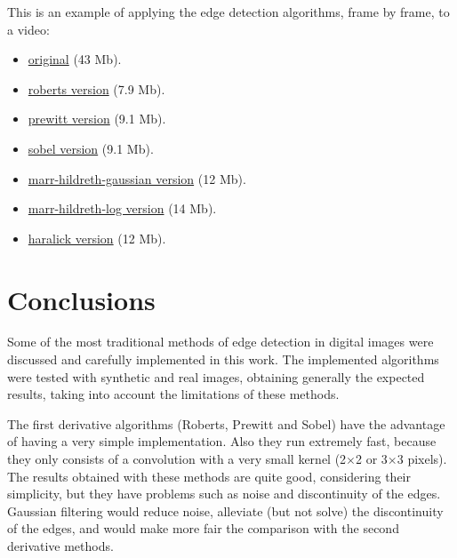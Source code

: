 \documentclass{ipol}
\numberwithin{equation}{section}
\numberwithin{table}{section}
\begin{document}
This is an example of applying the edge detection algorithms, frame by frame, to a video: 
\begin{multicols}{2}
\begin{itemize}
	\item \href{http://iie.fing.edu.uy/~haldos/ipol/video.mov}{original} (43 Mb).
	\item \href{http://iie.fing.edu.uy/~haldos/ipol/video-roberts-wide_0.1.mov}{roberts version} (7.9 Mb).
	\item \href{http://iie.fing.edu.uy/~haldos/ipol/video-prewitt-wide_0.1.mov}{prewitt version} (9.1 Mb).
	\item \href{http://iie.fing.edu.uy/~haldos/ipol/video-sobel-wide_0.1.mov}{sobel version} (9.1 Mb).
	\item \href{http://iie.fing.edu.uy/~haldos/ipol/video-marr-hildreth-gaussian-wide_3_19_0.04.mov}{marr-hildreth-gaussian version} (12 Mb).
	\item \href{http://iie.fing.edu.uy/~haldos/ipol/video-marr-hildreth-log-wide_3_25_0.04.mov}{marr-hildreth-log version} (14 Mb).
	\item \href{http://iie.fing.edu.uy/~haldos/ipol/video-haralick-wide_0.5.mov}{haralick version} (12 Mb).
\end{itemize}
\end{multicols}

\clearpage

\section{Conclusions}
\label{sec:conclusions}

Some of the most traditional methods of edge detection in digital images were discussed and carefully implemented in this work. The implemented algorithms were tested with synthetic and real images, obtaining generally the expected results, taking into account the limitations of these methods. 

The first derivative algorithms (Roberts, Prewitt and Sobel) have the advantage of having a very simple implementation. Also they run extremely fast, because they only consists of a convolution with a very small kernel (2$\times$2 or 3$\times$3 pixels). The results obtained with these methods are quite good, considering their simplicity, but they have problems such as noise and discontinuity of the edges. Gaussian filtering would reduce noise, alleviate (but not solve) the discontinuity of the edges, and would make more fair the comparison with the second derivative methods. 
\end{document}
